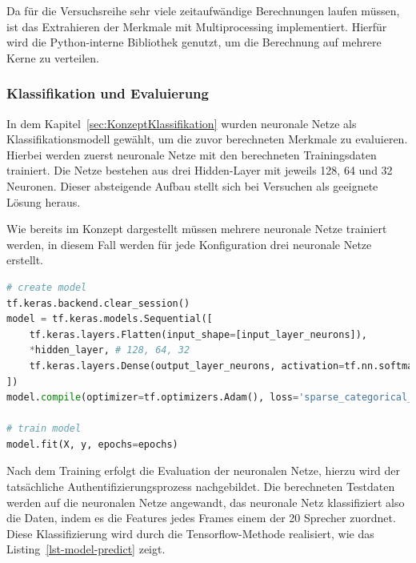 Da für die Versuchsreihe sehr viele zeitaufwändige Berechnungen laufen müssen, ist das Extrahieren der Merkmale mit Multiprocessing implementiert.
Hierfür wird die Python-interne Bibliothek  genutzt, um die Berechnung auf mehrere Kerne zu verteilen.



\subsubsection{Klassifikation und Evaluierung}
In dem Kapitel~\ref{sec:KonzeptKlassifikation} wurden neuronale Netze als Klassifikationsmodell gewählt, um die zuvor berechneten Merkmale zu evaluieren.
Hierbei werden zuerst neuronale Netze mit den berechneten Trainingsdaten trainiert.
Die Netze bestehen aus drei Hidden-Layer mit jeweils 128, 64 und 32 Neuronen.
Dieser absteigende Aufbau stellt sich bei Versuchen als geeignete Lösung heraus.

Wie bereits im Konzept dargestellt müssen mehrere neuronale Netze trainiert werden, in diesem Fall werden für jede Konfiguration drei neuronale Netze erstellt.

\begin{lstlisting}[language=Python,numbers=none,caption=Erstellen und Trainieren eines neuronalen Netzes,label=lst-nn]
# create model
tf.keras.backend.clear_session()
model = tf.keras.models.Sequential([
    tf.keras.layers.Flatten(input_shape=[input_layer_neurons]),
    *hidden_layer, # 128, 64, 32
    tf.keras.layers.Dense(output_layer_neurons, activation=tf.nn.softmax),
])
model.compile(optimizer=tf.optimizers.Adam(), loss='sparse_categorical_crossentropy', metrics=['accuracy'])

# train model
model.fit(X, y, epochs=epochs)
\end{lstlisting}

Nach dem Training erfolgt die Evaluation der neuronalen Netze, hierzu wird der tatsächliche Authentifizierungsprozess nachgebildet.
Die berechneten Testdaten werden auf die neuronalen Netze angewandt, das neuronale Netz klassifiziert also die Daten, indem es die Features jedes Frames einem der 20 Sprecher zuordnet.
Diese Klassifizierung wird durch die Tensorflow-Methode  realisiert, wie das Listing~\ref{lst-model-predict} zeigt.

